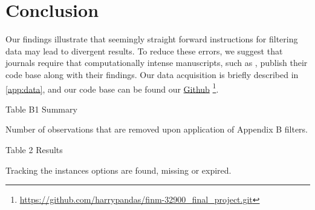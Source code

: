 \section{Conclusion} 

Our findings illustrate that seemingly straight forward instructions for filtering data may lead to divergent results. To reduce these errors, we suggest that journals require that computationally intense manuscripts, such as \citet{constantinides2013}, publish their code base along with their findings. Our data acquisition is briefly described in \autoref{app:data}, and our code base can be found our \href{https://github.com/harrypandas/finm-32900_final_project.git}{Github} \footnote{ \url{https://github.com/harrypandas/finm-32900_final_project.git} }.





\newpage

% 

\newpage

\thispagestyle{empty}
\begin{landscape}

\begin{table}

\centering
\caption{Table B1 Summary}
\resizebox{1.4\textwidth}{!}{
\hspace*{-4cm}

}
\caption*{
  Number of observations that are removed upon application of Appendix B filters. 
}
\label{table:tableB1}
\end{table}

\vfill
\raisebox{-3.5cm}{\makebox[\linewidth]{\thepage}}
\end{landscape}
\newpage

\thispagestyle{empty}
\begin{landscape}

\begin{table}
    \centering
    \caption{ Table 2 Results}
    
\resizebox{1.4\textwidth}{!}{
\hspace*{-4cm}
  
  }

  \caption*{Tracking the instances options are found, missing or expired.}
\label{tab:t2}
\end{table}
\vfill
\raisebox{-6.5cm}{\makebox[\linewidth]{\thepage}}
\end{landscape}
\newpage


